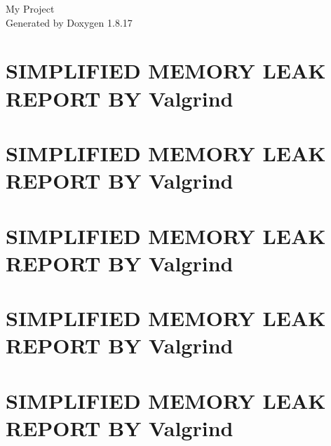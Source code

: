 \let\mypdfximage\pdfximage\def\pdfximage{\immediate\mypdfximage}\documentclass[twoside]{book}
\newcommand{\+}{\discretionary{\mbox{\scriptsize$\hookleftarrow$}}{}{}}
\newcommand{\clearemptydoublepage}{%
  \newpage{\pagestyle{empty}\cleardoublepage}%
}
\begin{document}
\hypersetup{pageanchor=false,
             bookmarksnumbered=true,
             pdfencoding=unicode
            }
\begin{titlepage}
\vspace*{7cm}
\begin{center}%
{\Large My Project }\\
\vspace*{1cm}
{\large Generated by Doxygen 1.8.17}\\
\end{center}
\end{titlepage}
\clearemptydoublepage
{}
\tableofcontents
\clearemptydoublepage
{}
\hypersetup{pageanchor=true}

\chapter{S\+I\+M\+P\+L\+I\+F\+I\+ED M\+E\+M\+O\+RY L\+E\+AK R\+E\+P\+O\+RT BY Valgrind}
\label{md_tests_output_ECommerce162_8mleaks_8simplified}

\chapter{S\+I\+M\+P\+L\+I\+F\+I\+ED M\+E\+M\+O\+RY L\+E\+AK R\+E\+P\+O\+RT BY Valgrind}
\label{md_tests_output_ECommerce30_8mleaks_8simplified}

\chapter{S\+I\+M\+P\+L\+I\+F\+I\+ED M\+E\+M\+O\+RY L\+E\+AK R\+E\+P\+O\+RT BY Valgrind}
\label{md_tests_output_ECommerce41_8mleaks_8simplified}

\chapter{S\+I\+M\+P\+L\+I\+F\+I\+ED M\+E\+M\+O\+RY L\+E\+AK R\+E\+P\+O\+RT BY Valgrind}
\label{md_tests_output_ECommerce5_8mleaks_8simplified}

\chapter{S\+I\+M\+P\+L\+I\+F\+I\+ED M\+E\+M\+O\+RY L\+E\+AK R\+E\+P\+O\+RT BY Valgrind}
\label{md_tests_output_ECommerce926_8mleaks_8simplified}

\end{document}
